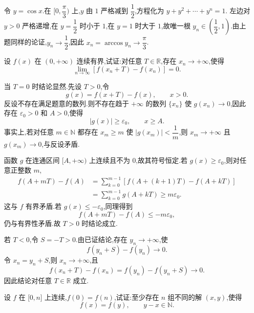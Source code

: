 \begin{solution}
    令 $y=\cos x$.在 $\lbrack0,\dfrac{\pi}{3})$ 上,$y$ 由 $1$ 严格减到 $\dfrac{1}{2}$,方程化为 $y+y^2+\cdots+y^n=1$.
    左边对 $y>0$ 严格递增,在 $y=\dfrac{1}{2}$ 时小于 $1$,在 $y=1$ 时大于 $1$,故唯一根 $y_n\in\left(\dfrac{1}{2},1\right)$.由上题同样的论证,$y_n\to\dfrac{1}{2}$,因此 $x_n=\arccos y_n\to\dfrac{\pi}{3}$.
\end{solution}

\begin{example}
    设 $f(x)$ 在 $(0,+\infty)$ 连续有界,试证:对任意 $T\in\mathbb{R}$,存在 $x_n\to+\infty$,使得
    \[
        \lim\limits_{n\to\infty}[f(x_n+T)-f(x_n)]=0.
    \]
\end{example}
\exampleblank

\begin{solution}
    当 $T=0$ 时结论显然.先设 $T>0$,令
    \[
        g(x)=f(x+T)-f(x),\qquad x>0.
    \]
    反设不存在满足题意的数列.则不存在趋于 $+\infty$ 的数列 $\{x_n\}$ 使 $g(x_n)\to0$,因此存在 $\varepsilon_0>0$ 和 $A>0$,使得
    \[
        |g(x)|\geq\varepsilon_0,\qquad x\geq A.
    \]
    事实上,若对任意 $m\in\mathbb{N}$ 都存在 $x_m\geq m$ 使 $|g(x_m)|<\dfrac{1}{m}$,则 $x_m\to+\infty$ 且 $g(x_m)\to0$,与反设矛盾.

    函数 $g$ 在连通区间 $\lbrack A,+\infty)$ 上连续且不为 $0$,故其符号恒定.若 $g(x)\geq\varepsilon_0$,则对任意正整数 $m$,
    \[
        \begin{aligned}
            f(A+mT)-f(A)
            &=\sum\limits_{k=0}^{m-1}
            [f(A+(k+1)T)-f(A+kT)]\\
            &=\sum\limits_{k=0}^{m-1}g(A+kT)
            \geq m\varepsilon_0.
        \end{aligned}
    \]
    这与 $f$ 有界矛盾.若 $g(x)\leq-\varepsilon_0$,同理得到
    \[
        f(A+mT)-f(A)\leq-m\varepsilon_0,
    \]
    仍与有界性矛盾.故 $T>0$ 时结论成立.

    若 $T<0$,令 $S=-T>0$.由已证结论,存在 $y_n\to+\infty$,使
    \[
        f(y_n+S)-f(y_n)\to0.
    \]
    令 $x_n=y_n+S$,则 $x_n\to+\infty$,且
    \[
        f(x_n+T)-f(x_n)
        =f(y_n)-f(y_n+S)\to0.
    \]
    因此结论对任意 $T\in\mathbb{R}$ 成立.
\end{solution}

\begin{example}
    设 $f$ 在 $\lbrack 0,n\rbrack$ 上连续,$f(0)=f(n)$,试证:至少存在 $n$ 组不同的解 $(x,y)$,使得
    \[
        f(x)=f(y),\qquad y-x\in\mathbb{N}.
    \]
\end{example}
\exampleblank

